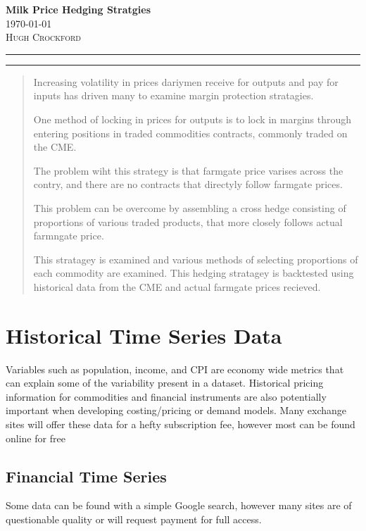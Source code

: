 \documentclass[11pt]{article}
\begin{document}
\begin{flushleft}
	\vspace*{0.3in}
	\Huge \textbf{Milk Price Hedging Stratgies}\\
	\Large \today \\
	\vspace{0.25in}
	\textsc{Hugh Crockford}
	\vspace{0.25in}
	\hrule
	\hrule
	\tableofcontents
\end{flushleft}

	\vspace{0.75in}
	\begin{abstract}
		Increasing volatility in prices dariymen receive for outputs and pay for inputs has driven many to examine margin protection stratagies.

		One method of locking in prices for outputs is to lock in margins through entering positions in traded commodities contracts, commonly traded on the CME.

		The problem wiht this strategy is that farmgate price varises across the contry, and there are no contracts that directyly follow farmgate prices.

		This problem can be overcome by assembling a cross hedge consisting of proportions of various traded products, that more closely follows actual farmngate price.

		This stratagey is examined and various methods of selecting proportions of each commodity are examined. This hedging stratagey is backtested using historical data from the CME and actual farmgate prices recieved.
	\end{abstract}

\newpage

\section{Historical Time Series Data}
	Variables such as population, income, and CPI are economy wide metrics that can explain some of the variability present in a dataset.
	Historical pricing information for commodities and financial instruments are also potentially important when developing costing/pricing or demand models.
	Many exchange sites will offer these data for a hefty subscription fee, however most can be found online for free

	\subsection{Financial Time Series}
	Some data can be found with a simple Google search, however many sites are of questionable quality or will request payment for full access.
\end{document}
